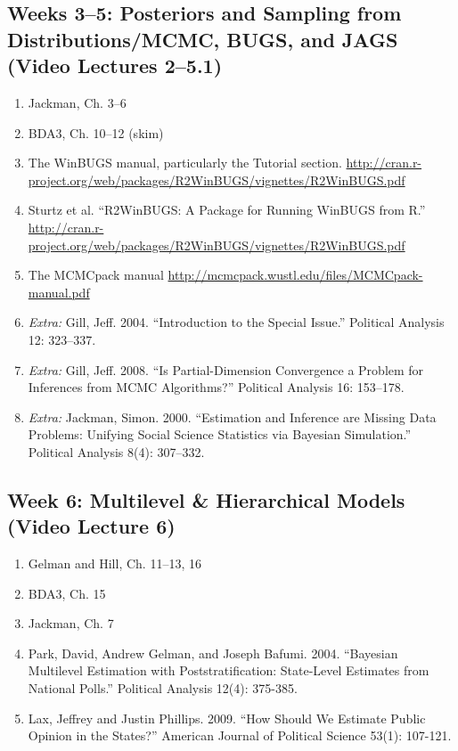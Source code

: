 \documentclass[11pt, leqno, fleqn]{article}
\begin{document}
\subsection*{Weeks 3--5: Posteriors and Sampling from Distributions/MCMC, BUGS, and JAGS (Video Lectures 2--5.1)} 
	\begin{enumerate}
	\item[] Jackman, Ch. 3--6
	\item[] BDA3, Ch. 10--12 (skim)
	\item[] The WinBUGS manual, particularly the Tutorial section. \url{http://cran.r-
project.org/web/packages/R2WinBUGS/vignettes/R2WinBUGS.pdf}
	\item[] Sturtz et al. ``R2WinBUGS: A Package for Running WinBUGS from R.'' \url{http://cran.r-project.org/web/packages/R2WinBUGS/vignettes/R2WinBUGS.pdf}
	\item[] The MCMCpack manual \url{http://mcmcpack.wustl.edu/files/MCMCpack-manual.pdf}
	\item[] {\em Extra:} Gill, Jeff. 2004. ``Introduction to the Special Issue.'' Political Analysis 12: 323--337.
	\item[] {\em Extra:} Gill, Jeff. 2008. ``Is Partial-Dimension Convergence a Problem for Inferences from MCMC Algorithms?'' Political Analysis 16: 153--178.
	\item[] {\em Extra:} Jackman, Simon. 2000. ``Estimation and Inference are Missing Data Problems: Unifying Social Science Statistics via Bayesian Simulation.'' Political Analysis 8(4): 307--332.
	\end{enumerate}
\subsection*{Week 6: Multilevel \& Hierarchical Models (Video Lecture 6)}
	\begin{enumerate}
	\item[] Gelman and Hill, Ch. 11--13, 16
	\item[] BDA3, Ch. 15
	\item[] Jackman, Ch. 7
	\item[] Park, David, Andrew Gelman, and Joseph Bafumi. 2004. ``Bayesian Multilevel Estimation with Poststratification: State-Level Estimates from National Polls.'' Political Analysis 12(4): 375-385.
	\item[] Lax, Jeffrey and Justin Phillips. 2009. ``How Should We Estimate Public Opinion in the States?'' American Journal of Political Science 53(1): 107-121.
	\end{enumerate}
\end{document}
